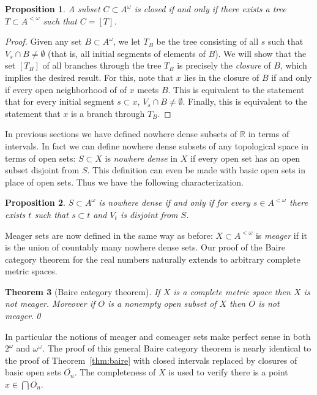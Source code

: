 \documentclass[11pt,oneside]{amsbook}
\newcommand{\RR}{\mathbb R}
\theoremstyle{definition}
\theoremstyle{plain}
\newtheorem{thm}{Theorem}[section]
\newtheorem{prop}[thm]{Proposition}
\theoremstyle{definition}
\theoremstyle{remark}
\numberwithin{equation}{section}
\numberwithin{figure}{section}
\begin{document}
\begin{prop}
  A subset $C\subset A^\omega$ is closed if and only if there exists a tree $T\subset A^{<\omega}$ such that $C=[T]$.
\end{prop}

\begin{proof}
  Given any set $B\subset A^\omega$, we let $T_B$ be the tree consisting of all $s$ such that $V_s\cap B\neq\emptyset$ (that is, all initial segments of elements of $B$). We will show that the set $[T_B]$ of all branches through the tree $T_B$ is precisely the \emph{closure} of $B$, which implies the desired result. For this, note that $x$ lies in the closure of $B$ if and only if every open neighborhood of of $x$ meets $B$. This is equivalent to the statement that for every initial segment $s\subset x$, $V_s\cap B\neq\emptyset$. Finally, this is equivalent to the statement that $x$ is a branch through $T_B$.
\end{proof}

In previous sections we have defined nowhere dense subsets of $\RR$ in terms of intervals. In fact we can define nowhere dense subsets of any topological space in terms of open sets: $S\subset X$ is \emph{nowhere dense} in $X$ if every open set has an open subset disjoint from $S$. This definition can even be made with basic open sets in place of open sets. Thus we have the following characterization.

\begin{prop}
  \label{prop:cantor-space-nwd}
  $S\subset A^\omega$ is nowhere dense if and only if for every $s\in A^{<\omega}$ there exists $t$ such that $s\subset t$ and $V_t$ is disjoint from $S$.
\end{prop}

Meager sets are now defined in the same way as before: $X\subset A^{<\omega}$ is \emph{meager} if it is the union of countably many nowhere dense sets. Our proof of the Baire category theorem for the real numbers naturally extends to arbitrary complete metric spaces.

\begin{thm}[Baire category theorem]
  If $X$ is a complete metric space then $X$ is not meager. Moreover if $O$ is a nonempty open subset of $X$ then $O$ is not meager.\qed
\end{thm}

In particular the notions of meager and comeager sets make perfect sense in both $2^\omega$ and $\omega^\omega$. The proof of this general Baire category theorem is nearly identical to the proof of Theorem~\ref{thm:baire} with closed intervals replaced by closures of basic open sets $\overline{O_n}$. The completeness of $X$ is used to verify there is a point $x\in\bigcap\overline{O_n}$.
\end{document}
